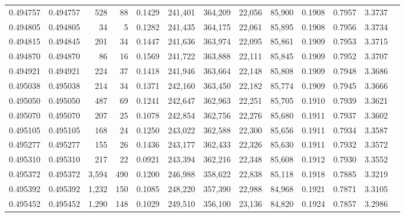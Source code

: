 \begin{tabular}{rrrrrrrrrrrrr}
0.494757 & 0.494757 &   528 &    88 &                                     0.1429 & 241,401 & 364,209 &  22,056 &  85,900 & 0.1908 & 0.7957 & 3.3737 \\
0.494805 & 0.494805 &    34 &     5 &                                     0.1282 & 241,435 & 364,175 &  22,061 &  85,895 & 0.1908 & 0.7956 & 3.3734 \\
0.494815 & 0.494845 &   201 &    34 &                                     0.1447 & 241,636 & 363,974 &  22,095 &  85,861 & 0.1909 & 0.7953 & 3.3715 \\
0.494870 & 0.494870 &    86 &    16 &                                     0.1569 & 241,722 & 363,888 &  22,111 &  85,845 & 0.1909 & 0.7952 & 3.3707 \\
0.494921 & 0.494921 &   224 &    37 &                                     0.1418 & 241,946 & 363,664 &  22,148 &  85,808 & 0.1909 & 0.7948 & 3.3686 \\
0.495038 & 0.495038 &   214 &    34 &                                     0.1371 & 242,160 & 363,450 &  22,182 &  85,774 & 0.1909 & 0.7945 & 3.3666 \\
0.495050 & 0.495050 &   487 &    69 &                                     0.1241 & 242,647 & 362,963 &  22,251 &  85,705 & 0.1910 & 0.7939 & 3.3621 \\
0.495070 & 0.495070 &   207 &    25 &                                     0.1078 & 242,854 & 362,756 &  22,276 &  85,680 & 0.1911 & 0.7937 & 3.3602 \\
0.495105 & 0.495105 &   168 &    24 &                                     0.1250 & 243,022 & 362,588 &  22,300 &  85,656 & 0.1911 & 0.7934 & 3.3587 \\
0.495277 & 0.495277 &   155 &    26 &                                     0.1436 & 243,177 & 362,433 &  22,326 &  85,630 & 0.1911 & 0.7932 & 3.3572 \\
0.495310 & 0.495310 &   217 &    22 &                                     0.0921 & 243,394 & 362,216 &  22,348 &  85,608 & 0.1912 & 0.7930 & 3.3552 \\
0.495372 & 0.495372 & 3,594 &   490 &                                     0.1200 & 246,988 & 358,622 &  22,838 &  85,118 & 0.1918 & 0.7885 & 3.3219 \\
0.495392 & 0.495392 & 1,232 &   150 &                                     0.1085 & 248,220 & 357,390 &  22,988 &  84,968 & 0.1921 & 0.7871 & 3.3105 \\
0.495452 & 0.495452 & 1,290 &   148 &                                     0.1029 & 249,510 & 356,100 &  23,136 &  84,820 & 0.1924 & 0.7857 & 3.2986 \\

\end{tabular}
